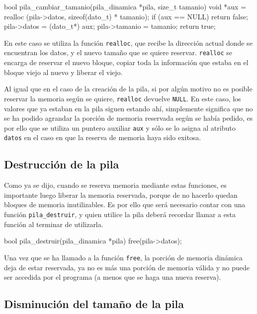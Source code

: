 \begin{codigo-c-plano}
bool pila_cambiar_tamanio(pila_dinamica *pila, size_t tamanio)
{
    void *aux = realloc (pila->datos, sizeof(dato_t) * tamanio);
    if (aux == NULL) return false;
    pila->datos = (dato_t*) aux;
    pila->tamanio = tamanio;
    return true;
}
\end{codigo-c-plano}

En este caso se utiliza la función \lstinline!realloc!, que recibe la
dirección actual donde se encuentran los datos, y el nuevo tamaño que se
quiere reservar.  \lstinline!realloc! se encarga de reservar el nuevo bloque,
copiar toda la información que estaba en el bloque viejo al nuevo y liberar el
viejo.

Al igual que en el caso de la creación de la pila, si por algún motivo no es
posible reservar la memoria según se quiere, \lstinline!realloc! devuelve
\lstinline!NULL!.  En este caso, los valores que ya estaban en la pila siguen
estando ahí, simplemente significa que no se ha podido agrandar la porción de
memoria reservada según se había pedido, es por ello que se utiliza un puntero
auxiliar \lstinline!aux! y sólo se lo asigna al atributo \lstinline!datos! en
el caso en que la reserva de memoria haya sido exitosa.

\subsection{Destrucción de la pila}

Como ya se dijo, cuando se reserva memoria mediante estas funciones, es
importante luego liberar la memoria reservada, porque de no hacerlo quedan
bloques de memoria inutilizables.  Es por ello que será necesario contar con
una función \lstinline!pila_destruir!, y quien utilice la pila deberá recordar
llamar a esta función al terminar de utilizarla.

\begin{codigo-c-plano}
bool pila_destruir(pila_dinamica *pila)
{
    free(pila->datos);
}
\end{codigo-c-plano}

Una vez que se ha llamado a la función \lstinline!free!, la porción de memoria
dinámica deja de estar reservada, ya no es más una porción de memoria válida y
no puede ser accedida por el programa (a menos que se haga una nueva reserva).  

\subsection{Disminución del tamaño de la pila}


